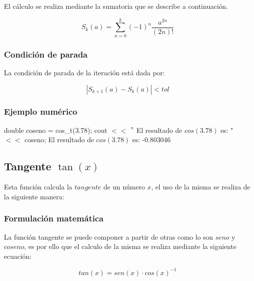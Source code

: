 \documentclass[10pt,a4paper]{article}
\begin{document}
	El cálculo se realiza mediante la sumatoria que se describe a continuación.
	
	\begin{equation}\label{key8}
		S_{k}(a) = \sum_{n=0}^{k}(-1)^{n}\frac{a^{2n}}{(2n)!}
	\end{equation}
	
	\subsubsection{Condición de parada}
	
	La condición de parada de la iteración está dada por: 
	
	\begin{equation}\label{key9}
		\left\lvert S_{k+1}(a) - S_{k}(a) \right\lvert < tol
	\end{equation}
	
	\subsubsection{Ejemplo numérico}

	double coseno = cos{\_}t(3.78); \newline
	cout $<<$ $"$ El resultado de $cos(3.78)$ es: " $<<$ coseno; \newline
	El resultado de $cos(3.78)$ es: -0.803046\newline

	\subsection{Tangente $\tan(x)$}
	
	Esta función calcula la $tangente$ de un número $x$, el uso de la misma se realiza de la siguiente manera:
	
	\begin{center}
	\end{center}
	
	\subsubsection{Formulación matemática}
	
	La función tangente se puede componer a partir de otras como lo son $seno$ y $coseno$, es por ello que el calculo de la misma se realiza mediante la siguiente ecuación:
	
	\begin{equation}\label{key10}
		tan(x) = sen(x)\cdot cos(x)^{-1}
	\end{equation}
	
\end{document}
